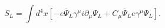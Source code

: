 \begin{equation}
S_L= \int d^4x [-e{\overline\Psi}_L\gamma^\mu i\partial_\mu\Psi_L
+ C_\mu{\overline\Psi}_L e\gamma^\mu \Psi_L]. \label{Laction}
\end{equation}


